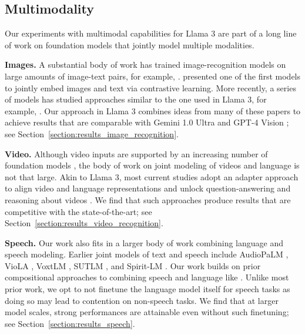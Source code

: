 \subsection{Multimodality}
\label{section:related_work_multimodality}
Our experiments with multimodal capabilities for Llama 3 are part of a long line of work on foundation models that jointly model multiple modalities.

\textbf{Images.} 
A substantial body of work has trained image-recognition models on large amounts of image-text pairs, for example, \citet{Mahajan_2018_ECCV,xiao2024florence,chameleon2024,openai2023gpt4blog}.
\citet{radford2021learning} presented one of the first models to jointly embed images and text via contrastive learning. 
More recently, a series of models has studied approaches similar to the one used in Llama 3, for example, \citet{alayrac2022flamingo,dai2023instructblip,liu2023llava,liu2023improvedllava,yang2023mmreact,ye2023mplug,zhu2023minigpt}.
Our approach in Llama 3 combines ideas from many of these papers to achieve results that are comparable with Gemini 1.0 Ultra \citep{gemini2023gemini} and GPT-4 Vision \citep{openai2023gpt4blog}; see Section~\ref{section:results_image_recognition}.


\textbf{Video.}
Although video inputs are supported by an increasing number of foundation models \citep{gemini2023gemini,openai2023gpt4blog}, the body of work on joint modeling of videos and language is not that large.
Akin to Llama 3, most current studies adopt an adapter approach to align video and language representations and unlock question-answering and reasoning about videos \citep{lin2023video,li2023videochat,Maaz2023VideoChatGPT,zhang2023videollama,zhao2022lavila}.
We find that such approaches produce results that are competitive with the state-of-the-art; see Section~\ref{section:results_video_recognition}.

\textbf{Speech.}
Our work also fits in a larger body of work combining language and speech modeling.
Earlier joint models of text and speech include AudioPaLM \citep{rubenstein2023audiopalm}, VioLA \citep{wang2023viola}, VoxtLM \cite{maiti2023voxtlm}, SUTLM \citep{chou2023sutlm}, and Spirit-LM \citep{nguyen2024spirit}.
Our work builds on prior compositional approaches to combining speech and language like \citet{fathullah2024audiochatllama}.
Unlike most prior work, we opt to not finetune the language model itself for speech tasks as doing so may lead to contention on non-speech tasks.
We find that at larger model scales, strong performances are attainable even without such finetuning; see Section~\ref{section:results_speech}.
